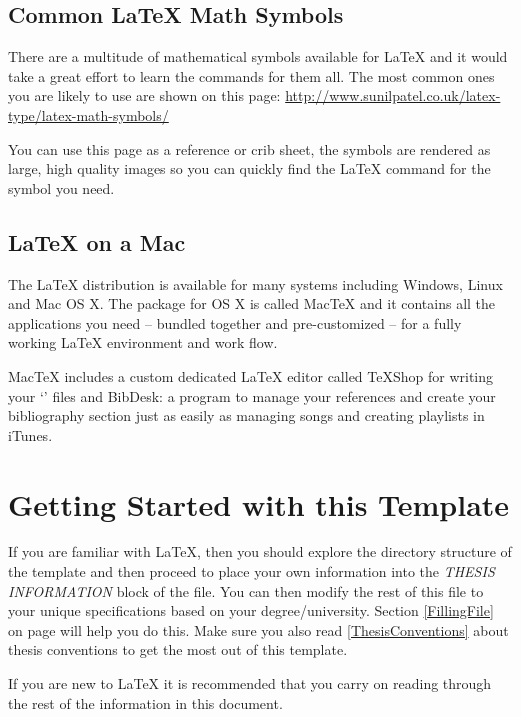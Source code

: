 \subsection{Common \LaTeX{} Math Symbols}
There are a multitude of mathematical symbols available for \LaTeX{} and it would take a great effort to learn the commands for them all. The most common ones you are likely to use are shown on this page:
\url{http://www.sunilpatel.co.uk/latex-type/latex-math-symbols/}

You can use this page as a reference or crib sheet, the symbols are rendered as large, high quality images so you can quickly find the \LaTeX{} command for the symbol you need.

\subsection{\LaTeX{} on a Mac}

The \LaTeX{} distribution is available for many systems including Windows, Linux and Mac OS X. The package for OS X is called MacTeX and it contains all the applications you need -- bundled together and pre-customized -- for a fully working \LaTeX{} environment and work flow.

MacTeX includes a custom dedicated \LaTeX{} editor called TeXShop for writing your `' files and BibDesk: a program to manage your references and create your bibliography section just as easily as managing songs and creating playlists in iTunes.


\section{Getting Started with this Template}

If you are familiar with \LaTeX{}, then you should explore the directory structure of the template and then proceed to place your own information into the \emph{THESIS INFORMATION} block of the  file. You can then modify the rest of this file to your unique specifications based on your degree/university. Section \autoref{FillingFile} on page \pageref{FillingFile} will help you do this. Make sure you also read \autoref{ThesisConventions} about thesis conventions to get the most out of this template.

If you are new to \LaTeX{} it is recommended that you carry on reading through the rest of the information in this document.

